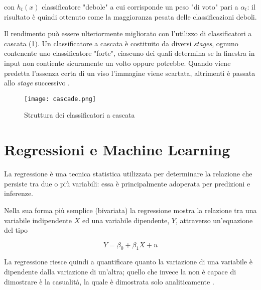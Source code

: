 con $h_t(x)$ classificatore "debole" a cui corrisponde un peso "di voto" pari a $\alpha_t$:
il risultato è quindi ottenuto come la maggioranza pesata delle classificazioni deboli.

\medskip

Il rendimento può essere ulteriormente migliorato con l'utilizzo di classificatori a cascata 
(\ref{fig:cascade}). Un classificatore a cascata è costituito da diversi \textit{stages}, 
ognuno contenente uno classificatore "forte", ciascuno dei quali determina se la finestra in 
input non contiente sicuramente un volto oppure potrebbe. Quando viene predetta l'assenza 
certa di un viso l'immagine viene scartata, altrimenti è passata allo \textit{stage} successivo 
\cite{Datta2015}.

\begin{figure}
    \begin{small}
        \begin{center}
            \texttt{[image: cascade.png]}
        \end{center}
        \caption{Struttura dei classificatori a cascata}
        \label{fig:cascade}
    \end{small}
\end{figure}

\newpage

\section{Regressioni e Machine Learning}
\label{section:regression_ml}

La regressione è una tecnica statistica utilizzata per determinare la relazione che persiste tra
due o più variabili: essa è principalmente adoperata per predizioni e inferenze.

Nella sua forma più semplice (bivariata) la regressione mostra la relazione tra una variabile 
indipendente $X$ ed una variabile dipendente, $Y$, attraverso un'equazione del tipo

\begin{equation}
    Y = \beta_0 + \beta_1 X + u
    \label{eq:biv_regression}
\end{equation}

La regressione riesce quindi a quantificare quanto la variazione di una variabile è dipendente 
dalla variazione di un'altra; quello che invece la non è capace di dimostrare è la casualità, 
la quale è dimostrata solo analiticamente \cite{campbell2008introduction}.

